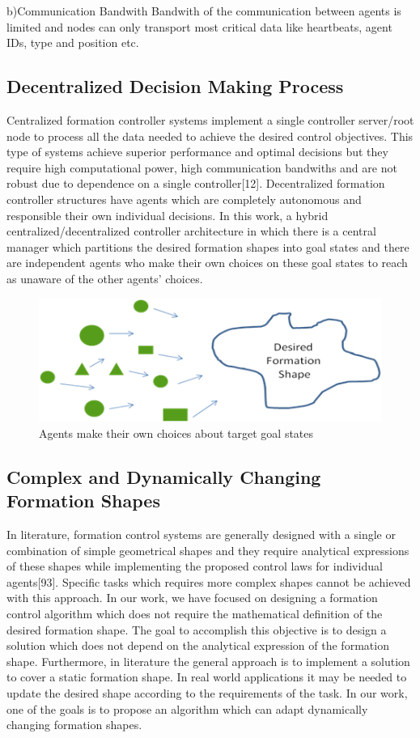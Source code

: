 b)Communication Bandwith \newline
Bandwith of the communication between agents is limited and nodes can only transport most critical data like heartbeats, agent IDs, type and position etc.

\subsection{ Decentralized Decision Making Process}
Centralized formation controller systems implement a single controller  server/root node
to process all the data needed to achieve the desired control objectives. This type of systems achieve superior performance and optimal decisions  but they require high computational power, high communication bandwiths and are not robust due to dependence on a single controller[12]. Decentralized formation controller structures have agents which are completely autonomous and responsible their own individual decisions. In this work, a hybrid centralized/decentralized controller architecture in which there is a central manager which partitions the desired formation shapes into goal states and there are independent agents who make their own choices on these goal states to reach as unaware of the other agents' choices.

\begin{figure}[H]
\caption{Agents make their own choices about target goal states}
\centering
\includegraphics[scale = 0.9]{decentralized}
\end{figure} 

\subsection{Complex and Dynamically Changing Formation Shapes}
In literature, formation control systems are generally designed with a single or combination of simple geometrical shapes and they require analytical expressions of these shapes while implementing the proposed control laws for individual agents[93]. Specific tasks which requires more complex shapes cannot be achieved with this approach. In our work, we have focused on designing a formation control algorithm which does not require the mathematical definition of the desired formation shape. The goal to accomplish this objective is to design a solution which does not depend on the analytical expression of the formation shape. Furthermore, in literature the general approach is to implement a solution to cover a static formation shape. In real world applications it may be needed to update the desired shape according to the requirements of the task. In our work, one of the goals is to propose an algorithm which can adapt dynamically changing formation shapes.


